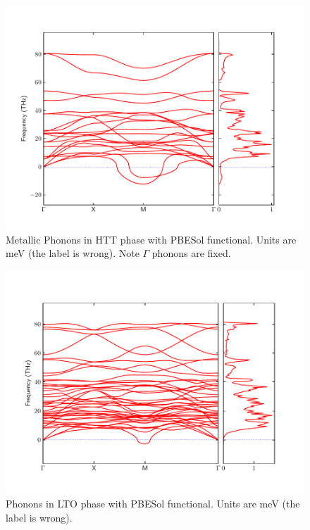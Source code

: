 \begin{figure}
    \centering
    \includegraphics[width=\textwidth]{fig/simulation/band_dos_htt_metal.pdf}
    \caption[HTT Phonons (PBESol, Metal)]{Metallic Phonons in HTT phase with PBESol functional. Units are meV (the label is wrong). Note $\Gamma$ phonons are fixed.}
    \label{fig:htt_metal_ph}
\end{figure}

\begin{figure}
    \centering
    \includegraphics[width=\textwidth]{fig/simulation/band_dos_lto.pdf}
    \caption[LTO Phonons (PBESol)]{Phonons in LTO phase with PBESol functional. Units are meV (the label is wrong).}
    \label{fig:lto_ps}
\end{figure}


